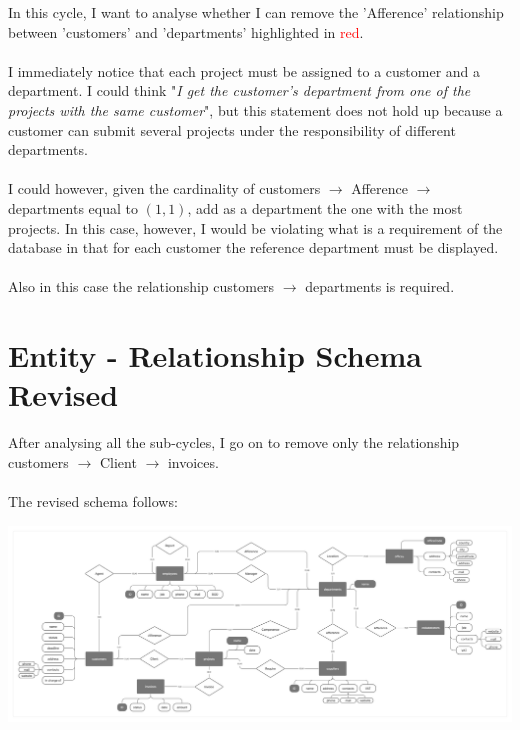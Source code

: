 \documentclass[12pt,a4paper]{article}
\begin{document}
In this cycle, I want to analyse whether I can remove the 'Afference' relationship between 'customers' and 'departments' highlighted in \textcolor{red}{red}.\\
\\
I immediately notice that each project must be assigned to a customer and a department. I could think "\textit{I get the customer's department from one of the projects with the same customer}", but this statement does not hold up because a customer can submit several projects under the responsibility of different departments.\\
\\
I could however, given the cardinality of customers $\rightarrow$ Afference $\rightarrow$ departments equal to $(1,1)$, add as a department the one with the most projects. In this case, however, I would be violating what is a requirement of the database in that for each customer the reference department must be displayed.\\
\\
Also in this case the relationship customers $\rightarrow$ departments is required.

\clearpage
\section{Entity - Relationship Schema Revised}\label{sec:entity-relationship-schema-revised}
After analysing all the sub-cycles, I go on to remove only the relationship customers $\rightarrow$ Client $\rightarrow$ invoices.\\
\\
The revised schema follows:
\begin{center}
\includegraphics[width=0.9\columnwidth]{../../img/er_scheme_reviewed}
\end{center}

\end{document}
